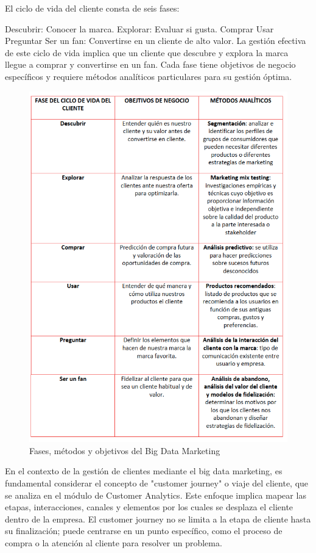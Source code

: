 \documentclass[
    a4paper, %
    10pt, %
    unnumberedsections, %
    twoside, %
]{LTJournalArticle}
\begin{document}
El ciclo de vida del cliente consta de seis fases:

Descubrir: Conocer la marca.
Explorar: Evaluar si gusta.
Comprar
Usar
Preguntar
Ser un fan: Convertirse en un cliente de alto valor.
La gestión efectiva de este ciclo de vida implica que un cliente que descubre y explora la marca llegue a comprar y convertirse en un fan. Cada fase tiene objetivos de negocio específicos y requiere métodos analíticos particulares para su gestión óptima.


\begin{figure}[h]
  \centering
  \includegraphics[width=0.7\linewidth]{./images/bgmkt.jpg}
  \caption{Fases, métodos y objetivos del Big Data Marketing}
  \label{fig:etiqueta}
\end{figure}


En el contexto de la gestión de clientes mediante el big data marketing, es fundamental considerar el concepto de "customer journey" o viaje del cliente, que se analiza en el módulo de Customer Analytics. Este enfoque implica mapear las etapas, interacciones, canales y elementos por los cuales se desplaza el cliente dentro de la empresa. El customer journey no se limita a la etapa de cliente hasta su finalización; puede centrarse en un punto específico, como el proceso de compra o la atención al cliente para resolver un problema.
\end{document}
